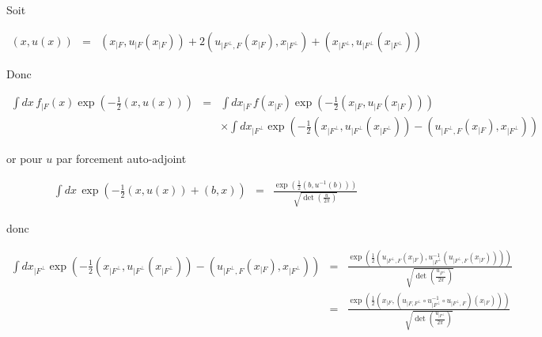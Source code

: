 Soit 

\begin{eqnarray*}
	\left ( x , u (x) \right ) & = & \left ( x_{\vert F } , u_{\vert F } \left (x_{\vert F } \right ) \right ) +  2 \left ( u_{\vert F^\perp , F   }\left (x_{\vert F } \right )  ,  x_{\vert F^\perp }  \right )   + \left ( x_{\vert F^\perp } , u_{\vert F^\perp } \left (x_{\vert F^\perp } \right ) \right )		
\end{eqnarray*}

Donc 

\begin{eqnarray*}
	\int d x \, f_{\vert F}(x) \exp \left ( - \frac{1}{2} ( x , u (x)) \right )  & = & \int d x_{\vert F} \,  f(x_{\vert F}) \exp \left ( - \frac{1}{2} \left ( x_{\vert F } , u_{\vert F } \left (x_{\vert F } \right ) \right ) \right ) \\
	&& \times \int d x_{\vert F^\perp}\exp \left ( - \frac{1}{2} \left ( x_{\vert F^\perp } , u_{\vert F^\perp } \left (x_{\vert F^\perp } \right ) \right ) - \left ( u_{\vert F^\perp , F   }\left (x_{\vert F } \right )  ,  x_{\vert F^\perp }  \right ) \right )		
\end{eqnarray*}

or pour $u$ par forcement auto-adjoint

\begin{eqnarray*}
	\int dx \,  \exp \left ( -\frac{1}{2} (x , u(x)) + (b , x)  \right ) & = & \frac{\exp \left( \frac{1}{2}(b , u^{-1}(b)) \right) }{\sqrt{ \det \left( \frac{u}{2\pi} \right) }}	
\end{eqnarray*}

donc 

\begin{eqnarray*}
	\int d x_{\vert F^\perp}\exp \left ( - \frac{1}{2} \left ( x_{\vert F^\perp } , u_{\vert F^\perp } \left (x_{\vert F^\perp } \right ) \right ) - \left ( u_{\vert F^\perp , F   }\left (x_{\vert F } \right )  ,  x_{\vert F^\perp }  \right ) \right ) & = & 	\frac{\exp \left( \frac{1}{2}(u_{\vert F^\perp , F   }\left (x_{\vert F } \right ) , u_{\vert F^\perp}^{-1}(u_{\vert F^\perp , F   }\left (x_{\vert F } \right ))) \right) }{\sqrt{ \det \left( \frac{u_{\vert F^\perp}}{2\pi} \right) }}	\\
	& = & 	\frac{\exp \left( \frac{1}{2} \left( x_{\vert F} , \left( u_{\vert F, F^\perp} \circ u_{\vert F^\perp}^{-1} \circ u_{\vert F^\perp, F} \right) \left( x_{\vert F} \right) \right) \right)}{\sqrt{ \det \left( \frac{u_{\vert F^\perp}}{2\pi} \right) }}
\end{eqnarray*}

